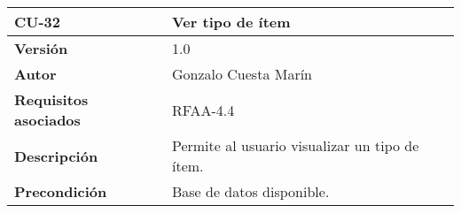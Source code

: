 \begin{longtable}[]{@{}ll@{}}
\toprule
\begin{minipage}[b]{0.18\columnwidth}\raggedright
\textbf{CU-32}\strut
\end{minipage} & \begin{minipage}[b]{0.76\columnwidth}\raggedright
\textbf{Ver tipo de ítem}\strut
\end{minipage}\tabularnewline
\midrule
\endhead
\begin{minipage}[t]{0.18\columnwidth}\raggedright
\textbf{Versión}\strut
\end{minipage} & \begin{minipage}[t]{0.76\columnwidth}\raggedright
1.0\strut
\end{minipage}\tabularnewline
\begin{minipage}[t]{0.18\columnwidth}\raggedright
\textbf{Autor}\strut
\end{minipage} & \begin{minipage}[t]{0.76\columnwidth}\raggedright
Gonzalo Cuesta Marín\strut
\end{minipage}\tabularnewline
\begin{minipage}[t]{0.18\columnwidth}\raggedright
\textbf{Requisitos asociados}\strut
\end{minipage} & \begin{minipage}[t]{0.76\columnwidth}\raggedright
RFAA-4.4\strut
\end{minipage}\tabularnewline
\begin{minipage}[t]{0.18\columnwidth}\raggedright
\textbf{Descripción}\strut
\end{minipage} & \begin{minipage}[t]{0.76\columnwidth}\raggedright
Permite al usuario visualizar un tipo de ítem.\strut
\end{minipage}\tabularnewline
\begin{minipage}[t]{0.18\columnwidth}\raggedright
\textbf{Precondición}\strut
\end{minipage} & \begin{minipage}[t]{0.76\columnwidth}\raggedright
Base de datos disponible.


\end{minipage}
\end{longtable}
